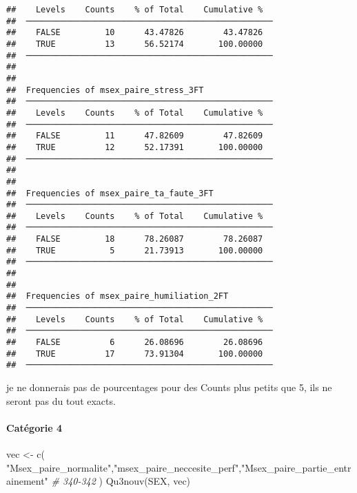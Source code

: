 \documentclass[
]{article}
\newenvironment{Shaded}{\begin{snugshade}}{\end{snugshade}}
\newcommand{\CommentTok}[1]{\textcolor[rgb]{0.56,0.35,0.01}{\textit{#1}}}
\newcommand{\FunctionTok}[1]{\textcolor[rgb]{0.00,0.00,0.00}{#1}}
\newcommand{\NormalTok}[1]{#1}
\newcommand{\OtherTok}[1]{\textcolor[rgb]{0.56,0.35,0.01}{#1}}
\newcommand{\StringTok}[1]{\textcolor[rgb]{0.31,0.60,0.02}{#1}}
\begin{document}
\begin{verbatim}
##    Levels    Counts    % of Total    Cumulative %   
##  ────────────────────────────────────────────────── 
##    FALSE         10      43.47826        43.47826   
##    TRUE          13      56.52174       100.00000   
##  ────────────────────────────────────────────────── 
## 
## 
##  Frequencies of msex_paire_stress_3FT               
##  ────────────────────────────────────────────────── 
##    Levels    Counts    % of Total    Cumulative %   
##  ────────────────────────────────────────────────── 
##    FALSE         11      47.82609        47.82609   
##    TRUE          12      52.17391       100.00000   
##  ────────────────────────────────────────────────── 
## 
## 
##  Frequencies of msex_paire_ta_faute_3FT             
##  ────────────────────────────────────────────────── 
##    Levels    Counts    % of Total    Cumulative %   
##  ────────────────────────────────────────────────── 
##    FALSE         18      78.26087        78.26087   
##    TRUE           5      21.73913       100.00000   
##  ────────────────────────────────────────────────── 
## 
## 
##  Frequencies of msex_paire_humiliation_2FT          
##  ────────────────────────────────────────────────── 
##    Levels    Counts    % of Total    Cumulative %   
##  ────────────────────────────────────────────────── 
##    FALSE          6      26.08696        26.08696   
##    TRUE          17      73.91304       100.00000   
##  ──────────────────────────────────────────────────
\end{verbatim}

je ne donnerais pas de pourcentages pour des Counts plus petits que 5,
ils ne seront pas du tout exacts.

\hypertarget{catuxe9gorie-4-3}{%
\paragraph{Catégorie 4}\label{catuxe9gorie-4-3}}

\begin{Shaded}
\begin{Highlighting}[]
\NormalTok{vec }\OtherTok{\textless{}{-}} \FunctionTok{c}\NormalTok{(  }
  \StringTok{"Msex\_paire\_normalite"}\NormalTok{,}\StringTok{"msex\_paire\_neccesite\_perf"}\NormalTok{,}\StringTok{"Msex\_paire\_partie\_entrainement"}  \CommentTok{\# 340{-}342}
\NormalTok{)}
\FunctionTok{Qu3nouv}\NormalTok{(SEX, vec)}
\end{Highlighting}
\end{Shaded}
\end{document}
